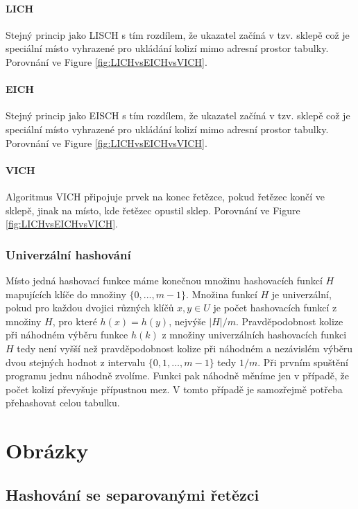 \documentclass{book}
\begin{document}
\subsubsection{LICH}
Stejný princip jako LISCH s tím rozdílem, že ukazatel začíná v tzv. sklepě což je speciální místo vyhrazené pro ukládání kolizí mimo adresní prostor tabulky. Porovnání ve Figure \ref{fig:LICHvsEICHvsVICH}.

\subsubsection{EICH}
Stejný princip jako EISCH s tím rozdílem, že ukazatel začíná v tzv. sklepě což je speciální místo vyhrazené pro ukládání kolizí mimo adresní prostor tabulky. Porovnání ve Figure \ref{fig:LICHvsEICHvsVICH}.

\subsubsection{VICH}
Algoritmus VICH připojuje prvek na konec řetězce, pokud řetězec končí ve sklepě, jinak na místo, kde řetězec opustil sklep. Porovnání ve Figure \ref{fig:LICHvsEICHvsVICH}.

\subsection{Univerzální hashování}
Místo jedná hashovací funkce máme konečnou množinu hashovacích funkcí $H$ mapujících klíče do množiny $\{ 0, ..., m - 1 \}$. Množina funkcí $H$ je univerzální, pokud pro každou dvojici různých klíčů $x, y \in U$ je počet hashovacích funkcí z množiny $H$, pro které $h(x) = h(y)$, nejvýše $|H|/m$. Pravděpodobnost kolize při náhodném výběru funkce $h(k)$ z množiny univerzálních hashovacích funkci $H$ tedy není vyšší než pravděpodobnost kolize při náhodném a nezávislém výběru dvou stejných hodnot z intervalu $\{0, 1, … , m-1\}$ tedy $1/m$. Při prvním spuštění programu jednu náhodně zvolíme. Funkci pak náhodně měníme jen v případě, že počet kolizí převyšuje přípustnou mez. V tomto případě je samozřejmě potřeba přehashovat celou tabulku.


\appendix
\chapter{Obrázky}
\section{Hashování se separovanými řetězci}
\end{document}
